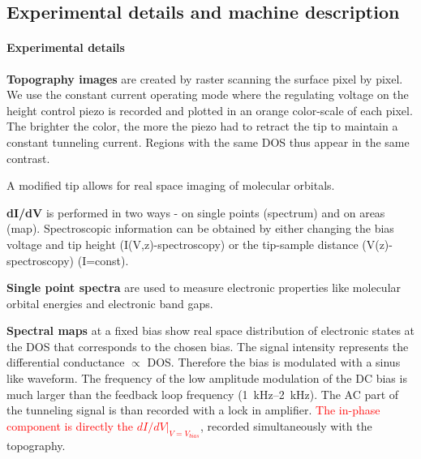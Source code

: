 
\subsection{Experimental details and machine description}

\paragraph{Experimental details}

	\textbf{Topography images} are created by raster scanning the surface pixel by pixel. 
	We use the constant current operating mode where the regulating voltage on the height control piezo is recorded and plotted in an orange color-scale of each pixel. The brighter the color, the more the piezo had to retract the tip to maintain a constant tunneling current. Regions with the same DOS thus appear in the same contrast.

	A modified tip allows for real space imaging of molecular orbitals.

	\textbf{dI/dV} is performed in two ways - on single points (spectrum) and on areas (map). Spectroscopic information can be obtained by either changing the bias voltage and tip height (I(V,z)-spectroscopy) or the tip-sample distance (V(z)-spectroscopy) (I=const).  

	\textbf{Single point spectra} are used to measure electronic properties like molecular orbital energies and electronic band gaps.
	
	\textbf{Spectral maps} at a fixed bias show real space distribution of electronic states at the DOS that corresponds to the chosen bias. The signal intensity represents the differential conductance $\propto$ DOS.
	Therefore the bias is modulated with a sinus like waveform. The frequency of the low amplitude modulation of the DC bias is much larger than the feedback loop frequency (\SIrange{1}{2}{\kilo \hertz}). The AC part of the tunneling signal is than recorded with a lock in amplifier. \textcolor{red}{The in-phase component is directly the $dI/dV|_{V=V_{bias}}$}, recorded simultaneously with the topography.


